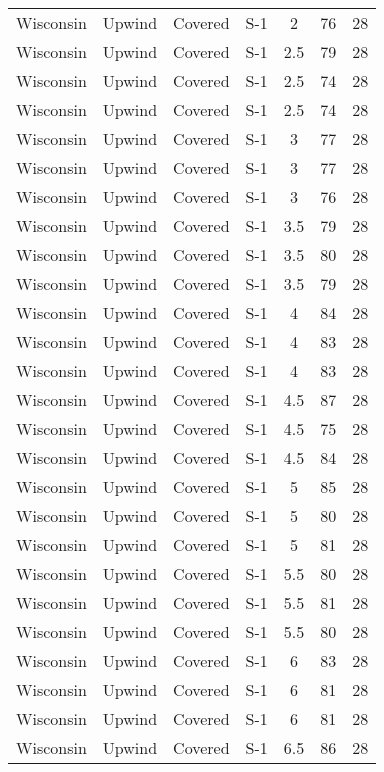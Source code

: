 \documentclass{article}
\begin{document}
\begin{longtable}[H]{ccccccc}
Wisconsin & Upwind   & Covered     & S-1 & 2    & 76  & 28 \\
Wisconsin & Upwind   & Covered     & S-1 & 2.5  & 79  & 28 \\
Wisconsin & Upwind   & Covered     & S-1 & 2.5  & 74  & 28 \\
Wisconsin & Upwind   & Covered     & S-1 & 2.5  & 74  & 28 \\
Wisconsin & Upwind   & Covered     & S-1 & 3    & 77  & 28 \\
Wisconsin & Upwind   & Covered     & S-1 & 3    & 77  & 28 \\
Wisconsin & Upwind   & Covered     & S-1 & 3    & 76  & 28 \\
Wisconsin & Upwind   & Covered     & S-1 & 3.5  & 79  & 28 \\
Wisconsin & Upwind   & Covered     & S-1 & 3.5  & 80  & 28 \\
Wisconsin & Upwind   & Covered     & S-1 & 3.5  & 79  & 28 \\
Wisconsin & Upwind   & Covered     & S-1 & 4    & 84  & 28 \\
Wisconsin & Upwind   & Covered     & S-1 & 4    & 83  & 28 \\
Wisconsin & Upwind   & Covered     & S-1 & 4    & 83  & 28 \\
Wisconsin & Upwind   & Covered     & S-1 & 4.5  & 87  & 28 \\
Wisconsin & Upwind   & Covered     & S-1 & 4.5  & 75  & 28 \\
Wisconsin & Upwind   & Covered     & S-1 & 4.5  & 84  & 28 \\
Wisconsin & Upwind   & Covered     & S-1 & 5    & 85  & 28 \\
Wisconsin & Upwind   & Covered     & S-1 & 5    & 80  & 28 \\
Wisconsin & Upwind   & Covered     & S-1 & 5    & 81  & 28 \\
Wisconsin & Upwind   & Covered     & S-1 & 5.5  & 80  & 28 \\
Wisconsin & Upwind   & Covered     & S-1 & 5.5  & 81  & 28 \\
Wisconsin & Upwind   & Covered     & S-1 & 5.5  & 80  & 28 \\
Wisconsin & Upwind   & Covered     & S-1 & 6    & 83  & 28 \\
Wisconsin & Upwind   & Covered     & S-1 & 6    & 81  & 28 \\
Wisconsin & Upwind   & Covered     & S-1 & 6    & 81  & 28 \\
Wisconsin & Upwind   & Covered     & S-1 & 6.5  & 86  & 28 \\

\end{longtable}
\end{document}
